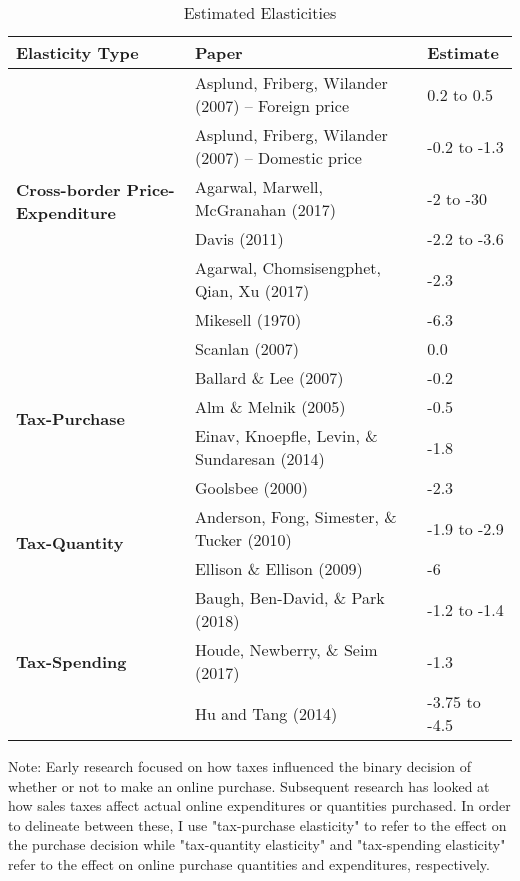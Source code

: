 \begin{table}[p]
\centering
\begin{threeparttable}
\caption{Estimated Elasticities}
\label{tab:elasticity}
\begin{tabular}{lll}
\hline
\textbf{Elasticity Type}           & \textbf{Paper}                     & \textbf{Estimate}     \\
\hline \hline
\multirow{6}{3.5cm}{\textbf{Cross-border Price-Expenditure}} &
  Asplund, Friberg, Wilander (2007) -- Foreign price    & 0.2 to 0.5   \\
& Asplund, Friberg, Wilander (2007) -- Domestic price & -0.2 to -1.3 \\
& Agarwal, Marwell, McGranahan (2017)                 & -2 to -30    \\
& Davis (2011)                                        & -2.2 to -3.6 \\
& Agarwal, Chomsisengphet, Qian, Xu (2017)            & -2.3         \\
& Mikesell (1970)                                     & -6.3         \\ \hline
\multirow{5}{3.5cm}{\textbf{Tax-Purchase}} &
  Scanlan (2007)                                        &  0.0          \\
& Ballard \& Lee (2007)                               & -0.2          \\
& Alm \& Melnik (2005)                                & -0.5          \\
& Einav, Knoepfle, Levin, \& Sundaresan (2014)        & -1.8          \\
& Goolsbee (2000)                                     & -2.3          \\ \hline
\multirow{2}{3.5cm}{\textbf{Tax-Quantity}} &
  Anderson, Fong, Simester, \& Tucker (2010)          & -1.9 to -2.9  \\
& Ellison \& Ellison (2009)                           & -6            \\ \hline
\multirow{3}{3.5cm}{\textbf{Tax-Spending}} &
  Baugh, Ben-David, \& Park (2018)                      & -1.2 to -1.4  \\
& Houde, Newberry, \& Seim (2017)                     & -1.3          \\
& Hu and Tang (2014)                                  & -3.75 to -4.5 \\ \hline
\end{tabular}
\begin{tablenotes}
\small
\item Note: Early research focused on how taxes influenced the binary decision of whether or not to make an online purchase. Subsequent research has looked at how sales taxes affect actual online expenditures or quantities purchased. In order to delineate between these, I use "tax-purchase elasticity" to refer to the effect on the purchase decision while "tax-quantity elasticity" and "tax-spending elasticity" refer to the effect on online purchase quantities and expenditures, respectively.
\end{tablenotes}
\end{threeparttable}
\end{table}
